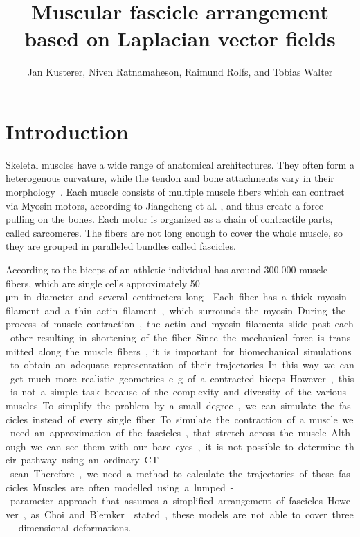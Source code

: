 \documentclass[preprint,journal]{vgtc}       %
\title{Muscular fascicle arrangement based on Laplacian vector fields}
\author{Jan Kusterer, Niven Ratnamaheson, Raimund Rolfs, and Tobias Walter}
\begin{document}
\maketitle

\section{Introduction}\label{sec:intro}
Skeletal muscles have a wide range of anatomical architectures. 
They often form a heterogenous curvature, while the tendon and bone attachments vary in their morphology~\cite{Choi2013}. 
Each muscle consists of multiple muscle fibers which can contract via Myosin motors, according to Jiangcheng et al. 
\cite{Jiangcheng2015}, and thus create a force pulling on the bones. 
Each motor is organized as a chain of contractile parts, called sarcomeres. 
The fibers are not long enough to cover the whole muscle, so they are grouped in paralleled bundles called fascicles. 

According to \cite{Etemadi.et.Al.} the biceps of an athletic individual has around 300.000 muscle fibers, which are single cells approximately 50 \si\micro m in diameter and several centimeters long \cite{Cooper2000}. 
Each fiber has a thick myosin filament and a thin actin filament, which surrounds the myosin. 
During the process of muscle contraction, the actin and myosin filaments slide past each other resulting in shortening of the fiber.

Since the mechanical force is transmitted along the muscle fibers, it is important for biomechanical simulations to obtain an adequate representation of their trajectories. 
In this way we can get much more realistic geometries e.g. of a contracted biceps.
However, this is not a simple task because of the complexity and diversity of the various muscles. 
To simplify the problem by a small degree, we can simulate the fascicles instead of every single fiber.

To simulate the contraction of a muscle we need an approximation of the fascicles, that stretch across the muscle. 
Although we can see them with our bare eyes, it is not possible to determine their pathway using an ordinary CT-scan. 
Therefore, we need a method to calculate the trajectories of these fascicles.
Muscles are often modelled using a lumped-parameter approach that assumes a simplified arrangement of fascicles. 
However, as Choi and Blemker \cite{Choi2013} stated, these models are not able to cover three-dimensional deformations.
\end{document}

